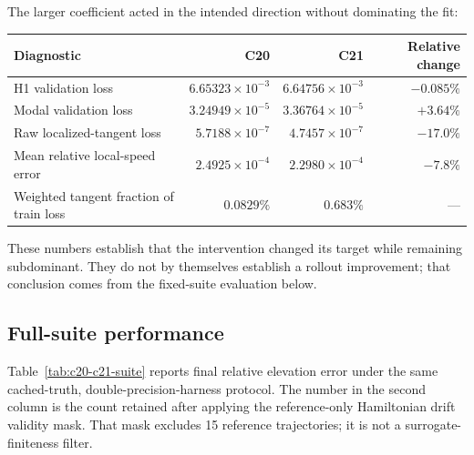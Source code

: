 \documentclass[11pt]{article}
\begin{document}
The larger coefficient acted in the intended direction without dominating the
fit:
\begin{center}
\begin{tabular}{lrrr}
\toprule
Diagnostic & C20 & C21 & Relative change \\
\midrule
H1 validation loss & $6.65323\times10^{-3}$ & $6.64756\times10^{-3}$ & $-0.085\%$ \\
Modal validation loss & $3.24949\times10^{-5}$ & $3.36764\times10^{-5}$ & $+3.64\%$ \\
Raw localized-tangent loss & $5.7188\times10^{-7}$ & $4.7457\times10^{-7}$ & $-17.0\%$ \\
Mean relative local-speed error & $2.4925\times10^{-4}$ & $2.2980\times10^{-4}$ & $-7.8\%$ \\
Weighted tangent fraction of train loss & $0.0829\%$ & $0.683\%$ & --- \\
\bottomrule
\end{tabular}
\end{center}
These numbers establish that the intervention changed its target while
remaining subdominant.  They do not by themselves establish a rollout
improvement; that conclusion comes from the fixed-suite evaluation below.

\subsection{Full-suite performance}

Table~\ref{tab:c20-c21-suite} reports final relative elevation error under the
same cached-truth, double-precision-harness protocol.  The number in the second
column is the count retained after applying the reference-only Hamiltonian
drift validity mask.  That mask excludes 15 reference trajectories; it is not
a surrogate-finiteness filter.
\end{document}
